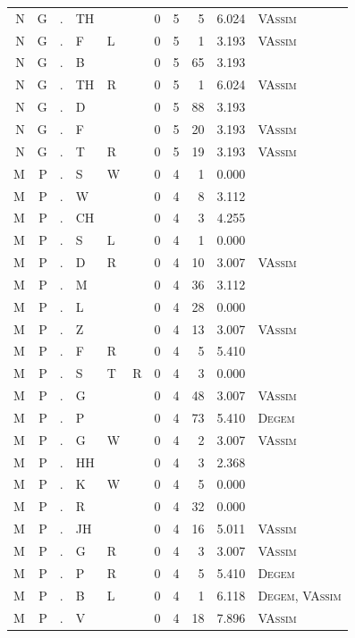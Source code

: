 \documentclass[12pt]{article}
\begin{document}
\begin{longtable}{r@{ } r@{ } c@{ } l@{ } l@{ } l@{ } r r r r l }
N & G & . & TH &  &  & 0 & 5 & 5 & 6.024 & \textsc{VAssim} \\
N & G & . & F & L &  & 0 & 5 & 1 & 3.193 & \textsc{VAssim} \\
N & G & . & B &  &  & 0 & 5 & 65 & 3.193 &  \\
N & G & . & TH & R &  & 0 & 5 & 1 & 6.024 & \textsc{VAssim} \\
N & G & . & D &  &  & 0 & 5 & 88 & 3.193 &  \\
N & G & . & F &  &  & 0 & 5 & 20 & 3.193 & \textsc{VAssim} \\
N & G & . & T & R &  & 0 & 5 & 19 & 3.193 & \textsc{VAssim} \\
M & P & . & S & W &  & 0 & 4 & 1 & 0.000 &  \\
M & P & . & W &  &  & 0 & 4 & 8 & 3.112 &  \\
M & P & . & CH &  &  & 0 & 4 & 3 & 4.255 &  \\
M & P & . & S & L &  & 0 & 4 & 1 & 0.000 &  \\
M & P & . & D & R &  & 0 & 4 & 10 & 3.007 & \textsc{VAssim} \\
M & P & . & M &  &  & 0 & 4 & 36 & 3.112 &  \\
M & P & . & L &  &  & 0 & 4 & 28 & 0.000 &  \\
M & P & . & Z &  &  & 0 & 4 & 13 & 3.007 & \textsc{VAssim} \\
M & P & . & F & R &  & 0 & 4 & 5 & 5.410 &  \\
M & P & . & S & T & R & 0 & 4 & 3 & 0.000 &  \\
M & P & . & G &  &  & 0 & 4 & 48 & 3.007 & \textsc{VAssim} \\
M & P & . & P &  &  & 0 & 4 & 73 & 5.410 & \textsc{Degem} \\
M & P & . & G & W &  & 0 & 4 & 2 & 3.007 & \textsc{VAssim} \\
M & P & . & HH &  &  & 0 & 4 & 3 & 2.368 &  \\
M & P & . & K & W &  & 0 & 4 & 5 & 0.000 &  \\
M & P & . & R &  &  & 0 & 4 & 32 & 0.000 &  \\
M & P & . & JH &  &  & 0 & 4 & 16 & 5.011 & \textsc{VAssim} \\
M & P & . & G & R &  & 0 & 4 & 3 & 3.007 & \textsc{VAssim} \\
M & P & . & P & R &  & 0 & 4 & 5 & 5.410 & \textsc{Degem} \\
M & P & . & B & L &  & 0 & 4 & 1 & 6.118 & \textsc{Degem}, \textsc{VAssim} \\
M & P & . & V &  &  & 0 & 4 & 18 & 7.896 & \textsc{VAssim} \\

\end{longtable}
\end{document}
